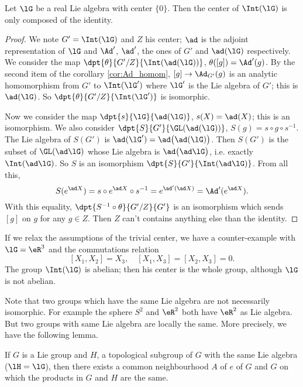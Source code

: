 \begin{corollary}
Let $\lG$ be a real Lie algebra with center $\{0\}$. Then the center of $\Int(\lG)$ is only composed of the identity.
\end{corollary}

\begin{proof}
We note $G'=\Int(\lG)$ and $Z$ his center; $\ad$ is the adjoint representation of $\lG$ and $\Ad'$, $\ad'$, the ones of $G'$ and $\ad(\lG)$ respectively. We consider the map $\dpt{\theta}{G'/Z}{\Int(\ad(\lG))}$, $\theta([g])=\Ad'(g)$. By the second item of the corollary \ref{cor:Ad_homom}, $[g]\to\Ad_{G'}(g)$ is an analytic homomorphism from $G'$ to $\Int(\lG')$ where $\lG'$ is the Lie algebra of $G'$; this is $\ad(\lG)$. So $\dpt{\theta}{G'/Z}{\Int(\lG')}$ is isomorphic.

Now we consider the map $\dpt{s}{\lG}{\ad(\lG)}$, $s(X)=\ad(X)$; this is an isomorphism. We also consider $\dpt{S}{G'}{ \GL(\ad(\lG))}$, $S(g)=s\circ g\circ s^{-1}$. The Lie algebra of $S(G')$ is $\ad(\lG')=\ad\big(\ad(\lG)\big)$. Then $S(G')$ is the subset of $\GL(\ad\lG)$ whose Lie algebra is $\ad\big(\ad\lG\big)$, i.e. exactly $\Int(\ad\lG)$. So $S$ is an isomorphism $\dpt{S}{G'}{\Int(\ad\lG)}$. From all this,
\begin{equation}
   S(e^{\ad X})=s\circ e^{\ad X}\circ s^{-1}
               =e^{\ad'(\ad X)}
           =\Ad'(e^{\ad X}).        
\end{equation}
With this equality, $\dpt{S^{-1}\circ\theta}{G'/Z}{G'}$ is an isomorphism which sends $[g]$ on $g$ for any $g\in Z$. Then $Z$ can't contains anything else than the identity.
\end{proof}

If we relax the assumptions of the trivial center, we have a counter-example with $\lG=\eR^3$ and the commutations relation
\[
   [X_1,X_2]=X_3,\quad [X_1,X_3]=[X_2,X_3]=0.
\]
The group $\Int(\lG)$ is abelian; then his center is the whole group, although $\lG$ is not abelian.

Note that two groups which have the same Lie algebra are not necessarily isomorphic. For example the sphere $S^2$ and $\eR^2$ both have $\eR^2$ as Lie algebra. But two groups with same Lie algebra are locally the same. More precisely, we have the following lemma.

\begin{lemma}
If $G$ is a Lie group and $H$, a topological subgroup of $G$ with the same Lie algebra ($\lH=\lG$), then there exists a common neighbourhood $A$ of $e$ of $G$ and $G$ on which the products in $G$ and $H$ are the same.
\end{lemma}

